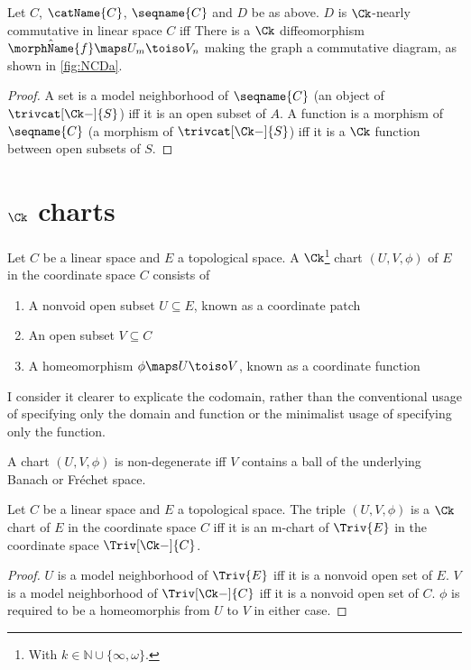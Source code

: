 \documentclass{article}
\begin{document}
\begin{lemma}
\label{lem:Ck-NCD}
Let $C$, $\catName{C}$, $\seqname{C}$ and $D$ be as above.  $D$ is
$\Ck$-nearly commutative in linear space $C$ iff There is a $\Ck$
diffeomorphism $\hat{\morphName{f}} \maps U_m \toiso V_n$ making the
graph a commutative diagram, as shown in \cref{fig:NCDa}.

\begin{proof}
A set is a model neighborhood of $\seqname{C}$ (an object of
$\trivcat[\Ck-]{S}$) iff it is an open subset of $A$. A function is a
morphism of $\seqname{C}$ (a morphism of $\trivcat[\Ck-]{S}$) iff it is
a $\Ck$ function between open subsets of $S$.
\end{proof}
\end{lemma}

\section{$\Ck$ charts}
{
  \showlabelsinline
  \label{sec:ckcharts}
}
\begin{definition}
\label{def:Ck-chart}
Let $C$ be a linear space and $E$ a topological space. A $\Ck$\footnote{
With $k \in \mathbb{N} \cup \{ \infty, \omega \}$.}
chart $(U, V, \phi)$ of $E$ in the coordinate space $C$ consists of

\begin{enumerate}
\item A nonvoid open subset $U \subseteq E$, known as a coordinate patch
\item An open subset $V \subseteq C$
\item A homeomorphism $\phi \maps U \toiso V$, known as a
coordinate function
\end{enumerate}
\begin{remark}
I consider it clearer to explicate the codomain, rather than the
conventional usage of specifying only the domain and function or the
minimalist usage of specifying only the function.
\end{remark}

A chart $(U, V, \phi)$ is non-degenerate iff $V$ contains a ball of the
underlying Banach or Fr\'echet space.
\end{definition}

\begin{lemma}
\label{lem:Ck-chart}
Let $C$ be a linear space and $E$ a topological space. The triple
$(U, V, \phi)$ is a $\Ck$ chart of $E$ in the coordinate space $C$ iff
it is an m-chart of $\Triv{E}$ in the coordinate space $\Triv[\Ck-]{C}$.

\begin{proof}
$U$ is a model neighborhood of $\Triv{E}$ iff it is a nonvoid open set
of $E$.  $V$ is a model neighborhood of $\Triv[\Ck-]{C}$ iff it is a
nonvoid open set of $C$.  $\phi$ is required to be a homeomorphis from
$U$ to $V$ in either case.
\end{proof}
\end{lemma}
\end{document}
